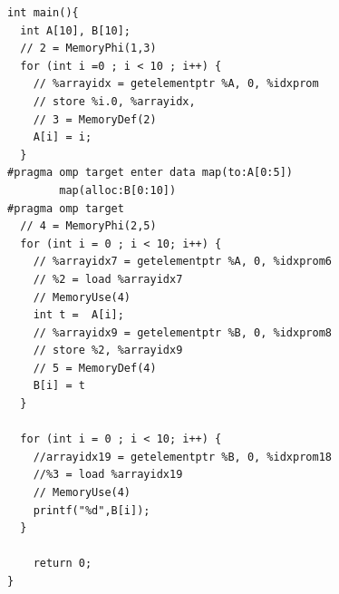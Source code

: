 \begin{minipage}{.6\textwidth}
\begin{lstlisting}[style=customc, basicstyle=\scriptsize, caption={OpenMP program, 
for \autoref{memorySSa-impl}}, label=memorySSa-impl-code]
int main(){
  int A[10], B[10];   
  // 2 = MemoryPhi(1,3)
  for (int i =0 ; i < 10 ; i++) {    
    // %arrayidx = getelementptr %A, 0, %idxprom
    // store %i.0, %arrayidx,
    // 3 = MemoryDef(2)
    A[i] = i;
  }
#pragma omp target enter data map(to:A[0:5]) 
        map(alloc:B[0:10])                                          
#pragma omp target
  // 4 = MemoryPhi(2,5)
  for (int i = 0 ; i < 10; i++) {
    // %arrayidx7 = getelementptr %A, 0, %idxprom6
    // %2 = load %arrayidx7
    // MemoryUse(4)
    int t =  A[i];    
    // %arrayidx9 = getelementptr %B, 0, %idxprom8
    // store %2, %arrayidx9 
    // 5 = MemoryDef(4)
    B[i] = t
  }

  for (int i = 0 ; i < 10; i++) {    
    //arrayidx19 = getelementptr %B, 0, %idxprom18       
    //%3 = load %arrayidx19
    // MemoryUse(4)
    printf("%d",B[i]);
  }

    return 0;
}
\end{lstlisting}
\end{minipage}
